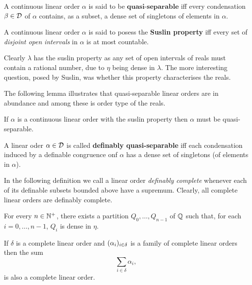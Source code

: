 	\begin{dfn}
		A continuous linear order $\alpha$ is said to be $\textbf{quasi-separable}$ iff every condensation $\beta\in\mathcal{D}$ of $\alpha$ contains, as a subset, a dense set of singletons of elements in $\alpha$.
	\end{dfn}

	\begin{dfn}
		A continuous linear order $\alpha$ is said to posess the \textbf{Suslin property} iff every set of \textit{disjoint open intervals} in $\alpha$ is at most countable.
	\end{dfn}

	Clearly $\lambda$ has the suslin property as any set of open intervals of reals must contain a rational number, due to $\eta$ being dense in $\lambda$.  The more interesting question, posed by Suslin, was whether this property characterises the reals.

	The following lemma illustrates that quasi-separable linear orders are in abundance and among these is order type of the reals.

	\begin{prp}
		If $\alpha$ is a continuous linear order with the suslin property then $\alpha$ must be quasi-separable.
	\end{prp}

	\begin{dfn}
		A linear oder $\alpha\in\mathcal{D}$ is called \textbf{definably quasi-separable} iff each condensation induced by a definable congruence onf $\alpha$ has a dense set of singletons (of elements in $\alpha$).
	\end{dfn}
	In the following definition we call a linear order \textit{definably complete} whenever each of its definable subsets bounded above have a supremum.  Clearly, all complete linear orders are definably complete.

	\begin{prp}\label{prp:qdense}
		For every $n\in\mathbb{N}^{+}$, there exists a partition $Q_0,\dotsc,Q_{n-1}$ of $\mathbb{Q}$ such that, for each $i=0,\dotsc,n-1$, $Q_i$ is dense in $\eta$.
	\end{prp}

	\begin{prp}\label{prp:csums}
		If $\delta$ is a complete linear order and $(\alpha_i)_{i\in\delta}$ is a family of complete linear orders then the sum
		\begin{equation}
			\sum_{i\in\delta}\alpha_i,
		\end{equation}
		is also a complete linear order.
	\end{prp}

